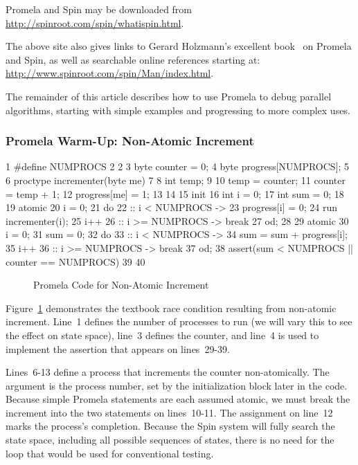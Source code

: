 Promela and Spin may be downloaded from
\url{http://spinroot.com/spin/whatispin.html}.

The above site also gives links to Gerard Holzmann's excellent
book~\cite{Holzmann03a} on Promela and Spin,
as well as searchable online references starting at:
\url{http://www.spinroot.com/spin/Man/index.html}.

The remainder of this article describes how to use Promela to debug
parallel algorithms, starting with simple examples and progressing to
more complex uses.

\subsubsection{Promela Warm-Up: Non-Atomic Increment}
\label{sec:formal:Promela Warm-Up: Non-Atomic Increment}

{ \scriptsize
\begin{verbbox}
  1 #define NUMPROCS 2
  2
  3 byte counter = 0;
  4 byte progress[NUMPROCS];
  5
  6 proctype incrementer(byte me)
  7 {
  8   int temp;
  9
 10   temp = counter;
 11   counter = temp + 1;
 12   progress[me] = 1;
 13 }
 14
 15 init {
 16   int i = 0;
 17   int sum = 0;
 18
 19   atomic {
 20     i = 0;
 21     do
 22     :: i < NUMPROCS ->
 23       progress[i] = 0;
 24       run incrementer(i);
 25       i++
 26     :: i >= NUMPROCS -> break
 27     od;
 28   }
 29   atomic {
 30     i = 0;
 31     sum = 0;
 32     do
 33     :: i < NUMPROCS ->
 34       sum = sum + progress[i];
 35       i++
 36     :: i >= NUMPROCS -> break
 37     od;
 38     assert(sum < NUMPROCS || counter == NUMPROCS)
 39   }
 40 }
\end{verbbox}
}
\begin{figure}[tbp]
\centering
\theverbbox
\caption{Promela Code for Non-Atomic Increment}
\label{fig:analysis:Promela Code for Non-Atomic Increment}
\end{figure}

Figure~\ref{fig:analysis:Promela Code for Non-Atomic Increment}
demonstrates the textbook race condition
resulting from non-atomic increment.
Line~1 defines the number of processes to run (we will vary this
to see the effect on state space), line~3 defines the counter,
and line~4 is used to implement the assertion that appears on
lines~29-39.

Lines~6-13 define a process that increments the counter non-atomically.
The argument  is the process number, set by the initialization
block later in the code.
Because simple Promela statements are each assumed atomic, we must
break the increment into the two statements on lines~10-11.
The assignment on line~12 marks the process's completion.
Because the Spin system will fully search the state space, including
all possible sequences of states, there is no need for the loop
that would be used for conventional testing.

